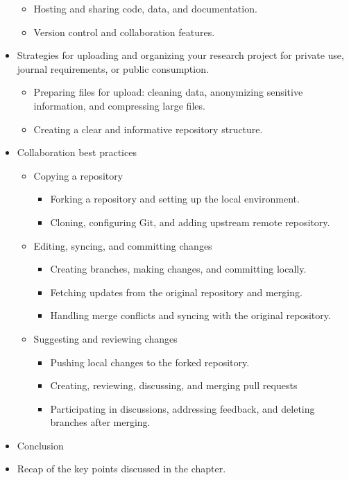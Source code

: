 \documentclass[
  letterpaper,
  DIV=11,
  numbers=noendperiod]{scrreprt}
\providecommand{\tightlist}{%
  \setlength{\itemsep}{0pt}\setlength{\parskip}{0pt}}\usepackage{longtable,booktabs,array}
\theoremstyle{definition}
\theoremstyle{remark}
\begin{document}
\begin{itemize}
  \begin{itemize}
  \tightlist
  \item
    Hosting and sharing code, data, and documentation.
  \item
    Version control and collaboration features.
  \end{itemize}
\item
  Strategies for uploading and organizing your research project for
  private use, journal requirements, or public consumption.

  \begin{itemize}
  \tightlist
  \item
    Preparing files for upload: cleaning data, anonymizing sensitive
    information, and compressing large files.
  \item
    Creating a clear and informative repository structure.
  \end{itemize}
\item
  Collaboration best practices

  \begin{itemize}
  \tightlist
  \item
    Copying a repository

    \begin{itemize}
    \tightlist
    \item
      Forking a repository and setting up the local environment.
    \item
      Cloning, configuring Git, and adding upstream remote repository.
    \end{itemize}
  \item
    Editing, syncing, and committing changes

    \begin{itemize}
    \tightlist
    \item
      Creating branches, making changes, and committing locally.
    \item
      Fetching updates from the original repository and merging.
    \item
      Handling merge conflicts and syncing with the original repository.
    \end{itemize}
  \item
    Suggesting and reviewing changes

    \begin{itemize}
    \tightlist
    \item
      Pushing local changes to the forked repository.
    \item
      Creating, reviewing, discussing, and merging pull requests
    \item
      Participating in discussions, addressing feedback, and deleting
      branches after merging.
    \end{itemize}
  \end{itemize}
\item
  Conclusion
\item
  Recap of the key points discussed in the chapter.


\end{itemize}
\end{document}
